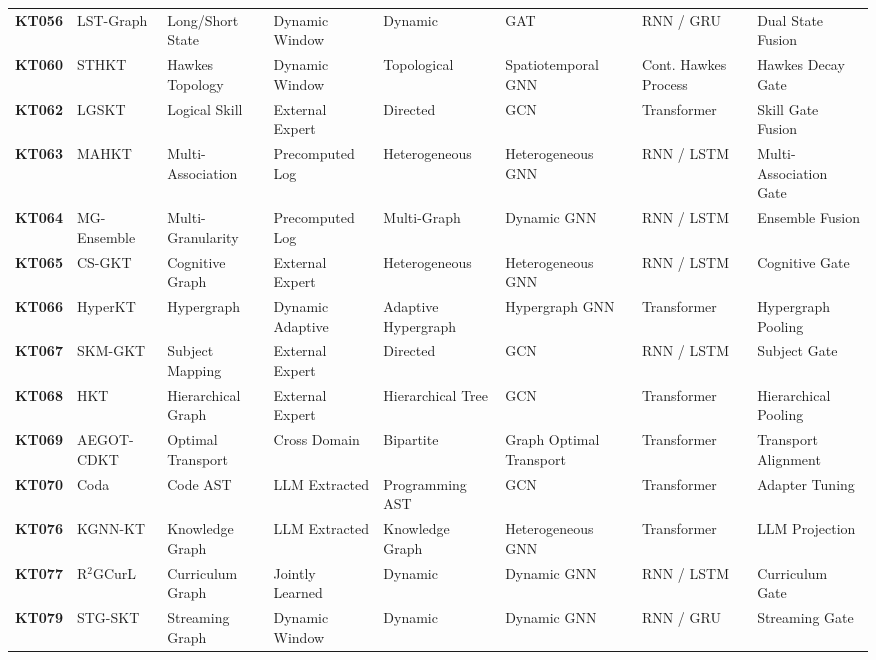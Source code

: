 \documentclass[journal]{IEEEtran}
\begin{document}
\begin{table}[t]
{\begin{tabular}{llllllll}
\textbf{KT056} & LST-Graph \cite{KT056_LSTGraph_2025} & Long/Short State & Dynamic Window & Dynamic & GAT & RNN / GRU & Dual State Fusion \\
\textbf{KT060} & STHKT \cite{KT060_STHKT_2025} & Hawkes Topology & Dynamic Window & Topological & Spatiotemporal GNN & Cont. Hawkes Process & Hawkes Decay Gate \\
\textbf{KT062} & LGSKT \cite{KT062_LGSKT_2025} & Logical Skill & External Expert & Directed & GCN & Transformer & Skill Gate Fusion \\
\textbf{KT063} & MAHKT \cite{KT063_MAHKT_2025} & Multi-Association & Precomputed Log & Heterogeneous & Heterogeneous GNN & RNN / LSTM & Multi-Association Gate \\
\textbf{KT064} & MG-Ensemble \cite{KT064_MGEnsemble_2025} & Multi-Granularity & Precomputed Log & Multi-Graph & Dynamic GNN & RNN / LSTM & Ensemble Fusion \\
\textbf{KT065} & CS-GKT \cite{KT065_CSGKT_2025} & Cognitive Graph & External Expert & Heterogeneous & Heterogeneous GNN & RNN / LSTM & Cognitive Gate \\
\textbf{KT066} & HyperKT \cite{KT066_HyperKT_2025} & Hypergraph & Dynamic Adaptive & Adaptive Hypergraph & Hypergraph GNN & Transformer & Hypergraph Pooling \\
\textbf{KT067} & SKM-GKT \cite{KT067_SKMGKT_2025} & Subject Mapping & External Expert & Directed & GCN & RNN / LSTM & Subject Gate \\
\textbf{KT068} & HKT \cite{KT068_HKT_2025} & Hierarchical Graph & External Expert & Hierarchical Tree & GCN & Transformer & Hierarchical Pooling \\
\textbf{KT069} & AEGOT-CDKT \cite{KT069_AEGOTCDKT_2025} & Optimal Transport & Cross Domain & Bipartite & Graph Optimal Transport & Transformer & Transport Alignment \\
\textbf{KT070} & Coda \cite{KT070_Coda_2025} & Code AST & LLM Extracted & Programming AST & GCN & Transformer & Adapter Tuning \\
\textbf{KT076} & KGNN-KT \cite{KT076_KGNNKT_2025} & Knowledge Graph & LLM Extracted & Knowledge Graph & Heterogeneous GNN & Transformer & LLM Projection \\
\textbf{KT077} & R$^2$GCurL \cite{KT077_R2GCurL_2026} & Curriculum Graph & Jointly Learned & Dynamic & Dynamic GNN & RNN / LSTM & Curriculum Gate \\
\textbf{KT079} & STG-SKT \cite{KT079_STGSKT_2026} & Streaming Graph & Dynamic Window & Dynamic & Dynamic GNN & RNN / GRU & Streaming Gate \\
\bottomrule
\end{tabular}
}
\end{table}
\end{document}
